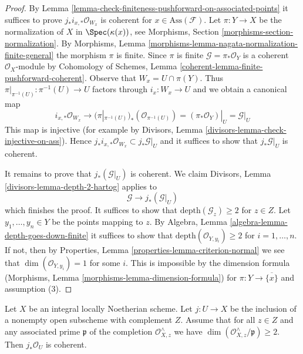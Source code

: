 \begin{proof}
By Lemma \ref{lemma-check-finiteness-pushforward-on-associated-points}
it suffices to prove $j_*i_{x, *}\mathcal{O}_{W_x}$ is coherent
for $x \in \text{Ass}(\mathcal{F})$.
Let $\pi : Y \to X$ be the normalization of $X$ in $\Spec(\kappa(x))$, see
Morphisms, Section \ref{morphisms-section-normalization}. By
Morphisms, Lemma \ref{morphisms-lemma-nagata-normalization-finite-general}
the morphism $\pi$ is finite. Since $\pi$ is finite
$\mathcal{G} = \pi_*\mathcal{O}_Y$ is a coherent $\mathcal{O}_X$-module by
Cohomology of Schemes, Lemma \ref{coherent-lemma-finite-pushforward-coherent}.
Observe that $W_x = U \cap \pi(Y)$. Thus
$\pi|_{\pi^{-1}(U)} : \pi^{-1}(U) \to U$ factors through $i_x : W_x \to U$
and we obtain a canonical map
$$
i_{x, *}\mathcal{O}_{W_x}
\longrightarrow
(\pi|_{\pi^{-1}(U)})_*(\mathcal{O}_{\pi^{-1}(U)}) =
(\pi_*\mathcal{O}_Y)|_U = \mathcal{G}|_U
$$
This map is injective (for example by Divisors, Lemma
\ref{divisors-lemma-check-injective-on-ass}). Hence
$j_*i_{x, *}\mathcal{O}_{W_x} \subset j_*\mathcal{G}|_U$
and it suffices to show that $j_*\mathcal{G}|_U$ is coherent.

\medskip\noindent
It remains to prove that $j_*(\mathcal{G}|_U)$ is coherent. We claim
Divisors, Lemma \ref{divisors-lemma-depth-2-hartog}
applies to
$$
\mathcal{G} \longrightarrow j_*(\mathcal{G}|_U)
$$
which finishes the proof. It suffices to show that
$\text{depth}(\mathcal{G}_z) \geq 2$ for $z \in Z$.
Let $y_1, \ldots, y_n \in Y$ be the points mapping to $z$.
By Algebra, Lemma \ref{algebra-lemma-depth-goes-down-finite}
it suffices to show that
$\text{depth}(\mathcal{O}_{Y, y_i}) \geq 2$ for $i = 1, \ldots, n$.
If not, then by Properties, Lemma \ref{properties-lemma-criterion-normal}
we see that $\dim(\mathcal{O}_{Y, y_i}) = 1$ for some $i$.
This is impossible by the dimension formula
(Morphisms, Lemma \ref{morphisms-lemma-dimension-formula})
for $\pi : Y \to \overline{\{x\}}$ and assumption (3).
\end{proof}

\begin{lemma}
\label{lemma-sharp-finiteness-pushforward}
Let $X$ be an integral locally Noetherian scheme. Let $j : U \to X$
be the inclusion of a nonempty open subscheme with complement $Z$. Assume
that for all $z \in Z$ and any associated prime $\mathfrak p$ of
the completion $\mathcal{O}_{X, z}^\wedge$
we have $\dim(\mathcal{O}_{X, z}^\wedge/\mathfrak p) \geq 2$.
Then $j_*\mathcal{O}_U$ is coherent.
\end{lemma}


